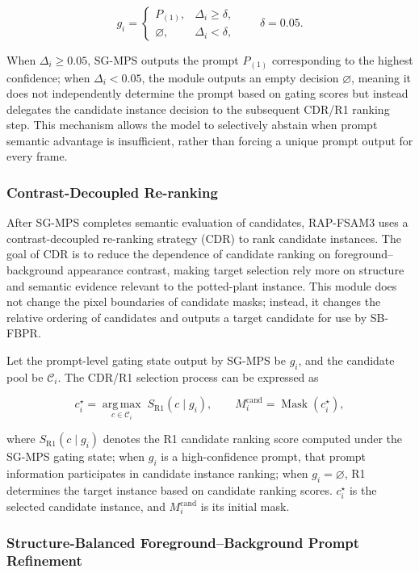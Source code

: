 \documentclass[a4paper]{cas-sc}
\begin{document}
\[
g_i=\begin{cases}
P_{(1)}, & \Delta_i\geq\delta,\\
\varnothing, & \Delta_i<\delta,
\end{cases}
\qquad \delta=0.05.
\]

When \(\Delta_i\geq 0.05\), SG-MPS outputs the prompt \(P_{(1)}\) corresponding to the highest confidence; when \(\Delta_i<0.05\), the module outputs an empty decision \(\varnothing\), meaning it does not independently determine the prompt based on gating scores but instead delegates the candidate instance decision to the subsequent CDR/R1 ranking step. This mechanism allows the model to selectively abstain when prompt semantic advantage is insufficient, rather than forcing a unique prompt output for every frame.

\subsubsection{Contrast-Decoupled Re-ranking}\label{sec:contrast-decoupled-reranking}

After SG-MPS completes semantic evaluation of candidates, RAP-FSAM3 uses a contrast-decoupled re-ranking strategy (CDR) to rank candidate instances. The goal of CDR is to reduce the dependence of candidate ranking on foreground--background appearance contrast, making target selection rely more on structure and semantic evidence relevant to the potted-plant instance. This module does not change the pixel boundaries of candidate masks; instead, it changes the relative ordering of candidates and outputs a target candidate for use by SB-FBPR.

Let the prompt-level gating state output by SG-MPS be \(g_i\), and the candidate pool be \(\mathcal{C}_i\). The CDR/R1 selection process can be expressed as

\[
c_i^{\star}=\underset{c\in\mathcal{C}_i}{\operatorname{arg\,max}}\;S_{\mathrm{R1}}(c\mid g_i),
\qquad M_i^{\mathrm{cand}}=\operatorname{Mask}(c_i^{\star}),
\]

where \(S_{\mathrm{R1}}(c\mid g_i)\) denotes the R1 candidate ranking score computed under the SG-MPS gating state; when \(g_i\) is a high-confidence prompt, that prompt information participates in candidate instance ranking; when \(g_i=\varnothing\), R1 determines the target instance based on candidate ranking scores. \(c_i^{\star}\) is the selected candidate instance, and \(M_i^{\mathrm{cand}}\) is its initial mask.

\subsubsection{Structure-Balanced Foreground--Background Prompt Refinement}\label{sec:foreground-background-refinement}
\end{document}
